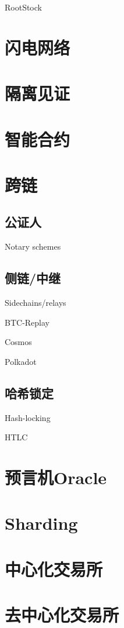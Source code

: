 \documentclass[UTF8]{ctexart}
\begin{document}
RootStock

\section{闪电网络}

\section{隔离见证}

\section{智能合约}

\section{跨链}

\subsection{公证人}
Notary schemes

\subsection{侧链/中继}
Sidechains/relays

BTC-Replay

Cosmos

Polkadot

\subsection{哈希锁定}
Hash-locking

HTLC

\section{预言机Oracle}

\section{Sharding}

\section{中心化交易所}

\section{去中心化交易所}
\end{document}
